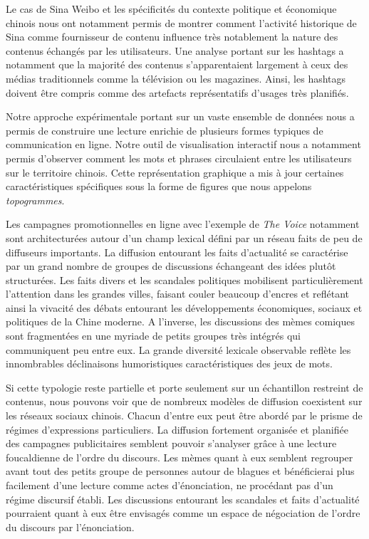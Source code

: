 Le cas de Sina Weibo et les spécificités du contexte politique et économique chinois nous ont notamment permis de montrer comment l'activité historique de Sina comme fournisseur de contenu influence très notablement la nature des contenus échangés par les utilisateurs. Une analyse portant sur les hashtags a notamment que la majorité des contenus s'apparentaient largement à ceux des médias traditionnels comme la télévision ou les magazines. Ainsi, les hashtags doivent être compris comme des artefacts représentatifs d'usages très planifiés. 

Notre approche expérimentale portant sur un vaste ensemble de données nous a permis de construire une lecture enrichie de plusieurs formes typiques de communication en ligne. Notre outil de visualisation interactif nous a notamment permis d'observer comment les mots et phrases circulaient entre les utilisateurs sur le territoire chinois. Cette représentation graphique a mis à jour certaines caractéristiques spécifiques sous la forme de figures que nous appelons \textit{topogrammes}.

Les campagnes promotionnelles en ligne avec l’exemple de \textit{The Voice} notamment sont architecturées autour d'un champ lexical défini par un réseau faits de peu de diffuseurs importants. La diffusion entourant les faits d'actualité se caractérise par un grand nombre de groupes de discussions échangeant des idées plutôt structurées. Les faits divers et les scandales politiques mobilisent particulièrement l'attention dans les grandes villes, faisant couler beaucoup d'encres et reflétant ainsi la vivacité des débats entourant les développements économiques, sociaux et politiques de la Chine moderne. A l’inverse, les discussions des mèmes comiques sont fragmentées en une myriade de petits groupes très intégrés qui communiquent peu entre eux. La grande diversité lexicale observable reflète les innombrables déclinaisons humoristiques caractéristiques des jeux de mots.

Si cette typologie reste partielle et porte seulement sur un échantillon restreint de contenus, nous pouvons voir que de nombreux modèles de diffusion coexistent sur les réseaux sociaux chinois. Chacun d'entre eux peut être abordé par le prisme de régimes d'expressions particuliers. La diffusion fortement organisée et planifiée des campagnes publicitaires semblent pouvoir s'analyser grâce à une lecture foucaldienne de l'ordre du discours. Les mèmes quant à eux semblent regrouper avant tout des petits groupe de personnes autour de blagues et bénéficierai plus facilement d'une lecture comme actes d'énonciation, ne procédant pas d'un régime discursif établi. Les discussions entourant les scandales et faits d'actualité pourraient quant à eux être envisagés comme un espace de négociation de l'ordre du discours par l'énonciation. 

